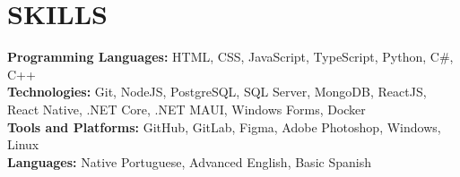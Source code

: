 \section{SKILLS}
\begin{itemize}[leftmargin=0in, label={}]
	\small{\item{
		\textbf{Programming Languages:}
		{HTML, CSS, JavaScript, TypeScript, Python, C\#, C++}
		\vspace{2pt} \\
				
		\textbf{Technologies:}
		{Git, NodeJS, PostgreSQL, SQL Server, MongoDB, ReactJS, React Native, .NET Core, .NET MAUI, Windows Forms, Docker}
		\vspace{2pt} \\
						     
		\textbf{Tools and Platforms:}
		{GitHub, GitLab, Figma, Adobe Photoshop, Windows, Linux}
		\vspace{2pt} \\
						     
		\textbf{Languages:}
		{Native Portuguese, Advanced English, Basic Spanish}
	}}
\end{itemize}